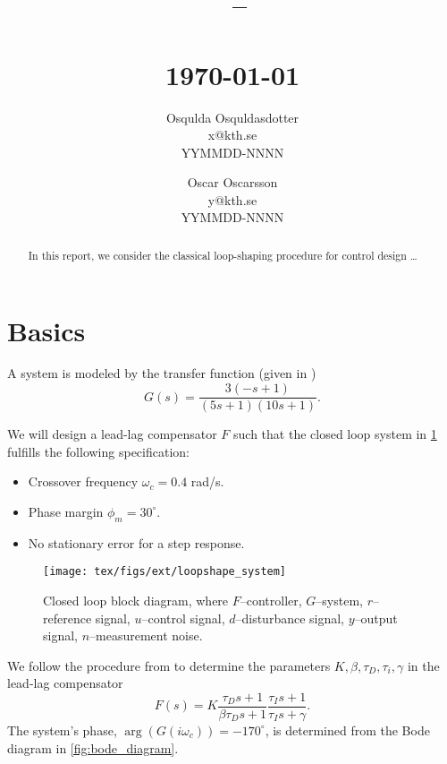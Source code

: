 \documentclass[a4paper]{article}
\title{
	\vspace{1.5in}
	\textmd{\textbf{\hmwkClass\ -- \hmwkClassName}}\\
	\vspace{0.2in}
	\textmd{\textbf{\hmwkTitle}}\\
	\normalsize\vspace{0.1in}\small{\today}\\
	\vspace{2in}
}
\author{
	Osqulda Osquldasdotter\\
	x@kth.se\\
	YYMMDD-NNNN
	\and
	Oscar Oscarsson\\
	y@kth.se\\
	YYMMDD-NNNN
}
\date{}
\begin{document}
\maketitle

\vfill
\begin{abstract}
	In this report, we consider the classical loop-shaping procedure for control design \ldots
\end{abstract}

\newpage



\section{Basics}
A system is modeled by the transfer function (given in \cite{exercise})
\begin{equation}
	G(s) = \frac{3(-s+1)}{(5s+1)(10s+1)}.
	\label{eq:system}
\end{equation}

We will design a lead-lag compensator $F$ such that the closed loop system in \cref{fig:block_diagram} fulfills the following specification:
\begin{itemize}\setlength{\itemsep}{-2pt}
	\item Crossover frequency $\omega_c = 0.4$ rad/s.
	\item Phase margin $\phi_m = 30^\circ$.
	\item No stationary error for a step response.
\end{itemize}

\begin{figure}[h!]
	\begin{center}
		\texttt{[image: tex/figs/ext/loopshape\_system]}
	\end{center}
	\caption{Closed loop block diagram, where $F$--controller, $G$--system, $r$--reference signal, $u$--control signal, $d$--disturbance signal, $y$--output signal, $n$--measurement noise.}
	\label{fig:block_diagram}
\end{figure}

We follow the procedure from \cite{basic_book} to determine the parameters $K, \beta, \tau_D, \tau_i, \gamma$ in the lead-lag compensator
\begin{equation}
	F(s) = K \frac{\tau_D s + 1}{\beta \tau_D s + 1} \frac{\tau_I s + 1}{\tau_I s + \gamma}.
	\label{eq:lead_lag}
\end{equation}
The system's phase, $\arg(G(i\omega_c)) = -170^\circ$, is determined from the Bode diagram in \cref{fig:bode_diagram}.
\end{document}
